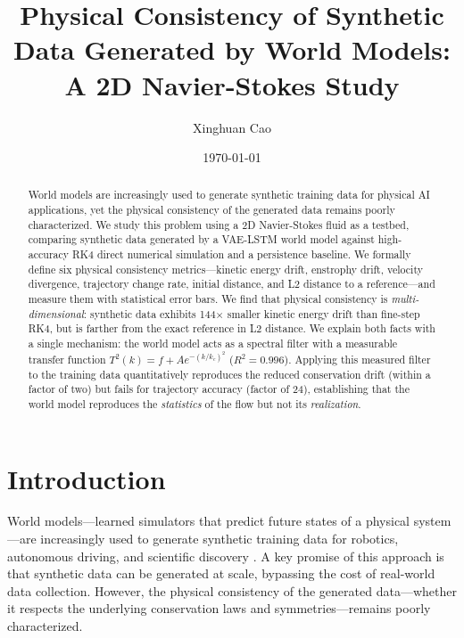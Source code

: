 \documentclass[reprint,aps,pre]{revtex4-2}
\begin{document}
\title{Physical Consistency of Synthetic Data Generated by World Models: A 2D Navier-Stokes Study}

\author{Xinghuan Cao}

\date{\today}

\begin{abstract}
World models are increasingly used to generate synthetic training data for physical AI applications, yet the physical consistency of the generated data remains poorly characterized. We study this problem using a 2D Navier-Stokes fluid as a testbed, comparing synthetic data generated by a VAE-LSTM world model against high-accuracy RK4 direct numerical simulation and a persistence baseline. We formally define six physical consistency metrics---kinetic energy drift, enstrophy drift, velocity divergence, trajectory change rate, initial distance, and L2 distance to a reference---and measure them with statistical error bars. We find that physical consistency is \textit{multi-dimensional}: synthetic data exhibits 144$\times$ smaller kinetic energy drift than fine-step RK4, but is farther from the exact reference in L2 distance. We explain both facts with a single mechanism: the world model acts as a spectral filter with a measurable transfer function $T^2(k) = f + A e^{-(k/k_c)^2}$ ($R^2 = 0.996$). Applying this measured filter to the training data quantitatively reproduces the reduced conservation drift (within a factor of two) but fails for trajectory accuracy (factor of 24), establishing that the world model reproduces the \textit{statistics} of the flow but not its \textit{realization}.
\end{abstract}

\maketitle

\section{Introduction}

World models---learned simulators that predict future states of a physical system---are increasingly used to generate synthetic training data for robotics, autonomous driving, and scientific discovery \cite{ha2018worldmodels,hafner2020dreamer,hafner2023dreamerv3}. A key promise of this approach is that synthetic data can be generated at scale, bypassing the cost of real-world data collection. However, the physical consistency of the generated data---whether it respects the underlying conservation laws and symmetries---remains poorly characterized.
\end{document}
